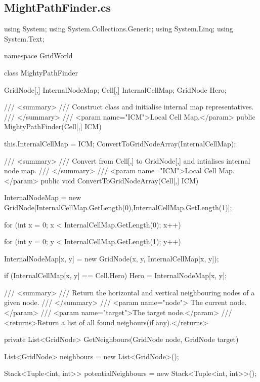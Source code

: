 \documentclass[11pt]{article}
\begin{document}
\subsection*{MightPathFinder.cs}
\begin{code}
using System;
using System.Collections.Generic;
using System.Linq;
using System.Text;

namespace GridWorld
{
    class MightyPathFinder
    {
        GridNode[,] InternalNodeMap;
        Cell[,] InternalCellMap;
        GridNode Hero;


        /// <summary>
        /// Construct class and initialise internal map representatives.
        /// </summary>
        /// <param name="ICM">Local Cell Map.</param>
        public MightyPathFinder(Cell[,] ICM)
        {
            this.InternalCellMap = ICM;
            ConvertToGridNodeArray(InternalCellMap);
            
        }

       
        /// <summary>
        /// Convert from Cell[,] to GridNode[,] and intialises internal node map.
        /// </summary>
        /// <param name="ICM">Local Cell Map.</param>
        public void ConvertToGridNodeArray(Cell[,] ICM)
        {
            InternalNodeMap = new GridNode[InternalCellMap.GetLength(0),InternalCellMap.GetLength(1)];

            for (int x = 0; x < InternalCellMap.GetLength(0); x++)
            {
                for (int y = 0; y < InternalCellMap.GetLength(1); y++)
                {
                    InternalNodeMap[x, y] = new GridNode(x, y, InternalCellMap[x, y]);

                    if (InternalCellMap[x, y] == Cell.Hero)
                    {
                        Hero = InternalNodeMap[x, y];
                    }
                }
            }
        }

        /// <summary>
        /// Return the horizontal and vertical neighbouring nodes of a given node. 
        /// </summary>
        /// <param name="node"> The current node.</param>
        /// <param name="target">The target node.</param>
        /// <returns>Return a list of all found neigbours(if any).</returns>

        private List<GridNode> GetNeighbours(GridNode node, GridNode target)
        {

            List<GridNode> neighbours = new List<GridNode>();

            Stack<Tuple<int, int>> potentialNeighbours
                    = new Stack<Tuple<int, int>>();

}}}
\end{code}
\end{document}

